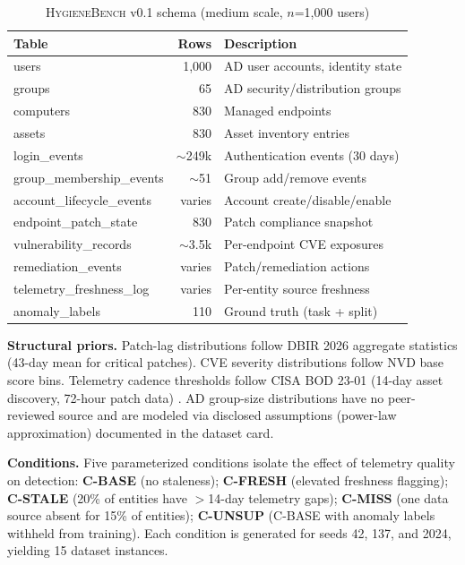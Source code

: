 \documentclass[conference]{IEEEtran}
\newcommand{\hb}{\textsc{HygieneBench}\xspace}
\begin{document}
\begin{table}[t]
\centering
\caption{\hb v0.1 schema (medium scale, $n$=1,000 users)}
\label{tab:schema}
\footnotesize
\setlength{\tabcolsep}{3pt}
\begin{tabular}{@{} >{\ttfamily\raggedright\arraybackslash}p{4.5cm}
                    r
                    >{\raggedright\arraybackslash}p{2.5cm} @{}}
\toprule
\normalfont Table & Rows & Description \\
\midrule
users                     & 1,000      & AD user accounts, identity state \\
groups                    & 65         & AD security/distribution groups \\
computers                 & 830        & Managed endpoints \\
assets                    & 830        & Asset inventory entries \\
login\_events             & $\sim$249k & Authentication events (30 days) \\
group\_membership\_events & $\sim$51   & Group add/remove events \\
account\_lifecycle\_events & varies    & Account create/disable/enable \\
endpoint\_patch\_state    & 830        & Patch compliance snapshot \\
vulnerability\_records    & $\sim$3.5k & Per-endpoint CVE exposures \\
remediation\_events       & varies     & Patch/remediation actions \\
telemetry\_freshness\_log & varies     & Per-entity source freshness \\
anomaly\_labels           & 110        & Ground truth (task + split) \\
\bottomrule
\end{tabular}
\end{table}

\textbf{Structural priors.} Patch-lag distributions follow DBIR 2026 aggregate
statistics (43-day mean for critical patches). CVE severity distributions follow
NVD base score bins. Telemetry cadence thresholds follow CISA BOD 23-01 (14-day
asset discovery, 72-hour patch data) \cite{cisa_bod2301_2022}. AD group-size
distributions have no peer-reviewed source and are modeled via disclosed
assumptions (power-law approximation) documented in the dataset card.

\textbf{Conditions.} Five parameterized conditions isolate the effect of telemetry
quality on detection: \textbf{C-BASE} (no staleness); \textbf{C-FRESH} (elevated
freshness flagging); \textbf{C-STALE} (20\% of entities have $>$14-day telemetry
gaps); \textbf{C-MISS} (one data source absent for 15\% of entities);
\textbf{C-UNSUP} (C-BASE with anomaly labels withheld from training). Each
condition is generated for seeds 42, 137, and 2024, yielding 15 dataset instances.
\end{document}
